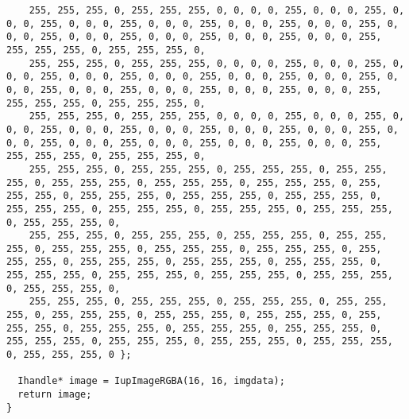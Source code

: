 \documentclass{ctexart}
\begin{document}
\begin{lstlisting}
    255, 255, 255, 0, 255, 255, 255, 0, 0, 0, 0, 255, 0, 0, 0, 255, 0, 0, 0, 255, 0, 0, 0, 255, 0, 0, 0, 255, 0, 0, 0, 255, 0, 0, 0, 255, 0, 0, 0, 255, 0, 0, 0, 255, 0, 0, 0, 255, 0, 0, 0, 255, 0, 0, 0, 255, 255, 255, 255, 0, 255, 255, 255, 0,
    255, 255, 255, 0, 255, 255, 255, 0, 0, 0, 0, 255, 0, 0, 0, 255, 0, 0, 0, 255, 0, 0, 0, 255, 0, 0, 0, 255, 0, 0, 0, 255, 0, 0, 0, 255, 0, 0, 0, 255, 0, 0, 0, 255, 0, 0, 0, 255, 0, 0, 0, 255, 0, 0, 0, 255, 255, 255, 255, 0, 255, 255, 255, 0,
    255, 255, 255, 0, 255, 255, 255, 0, 0, 0, 0, 255, 0, 0, 0, 255, 0, 0, 0, 255, 0, 0, 0, 255, 0, 0, 0, 255, 0, 0, 0, 255, 0, 0, 0, 255, 0, 0, 0, 255, 0, 0, 0, 255, 0, 0, 0, 255, 0, 0, 0, 255, 0, 0, 0, 255, 255, 255, 255, 0, 255, 255, 255, 0,
    255, 255, 255, 0, 255, 255, 255, 0, 255, 255, 255, 0, 255, 255, 255, 0, 255, 255, 255, 0, 255, 255, 255, 0, 255, 255, 255, 0, 255, 255, 255, 0, 255, 255, 255, 0, 255, 255, 255, 0, 255, 255, 255, 0, 255, 255, 255, 0, 255, 255, 255, 0, 255, 255, 255, 0, 255, 255, 255, 0, 255, 255, 255, 0,
    255, 255, 255, 0, 255, 255, 255, 0, 255, 255, 255, 0, 255, 255, 255, 0, 255, 255, 255, 0, 255, 255, 255, 0, 255, 255, 255, 0, 255, 255, 255, 0, 255, 255, 255, 0, 255, 255, 255, 0, 255, 255, 255, 0, 255, 255, 255, 0, 255, 255, 255, 0, 255, 255, 255, 0, 255, 255, 255, 0, 255, 255, 255, 0,
    255, 255, 255, 0, 255, 255, 255, 0, 255, 255, 255, 0, 255, 255, 255, 0, 255, 255, 255, 0, 255, 255, 255, 0, 255, 255, 255, 0, 255, 255, 255, 0, 255, 255, 255, 0, 255, 255, 255, 0, 255, 255, 255, 0, 255, 255, 255, 0, 255, 255, 255, 0, 255, 255, 255, 0, 255, 255, 255, 0, 255, 255, 255, 0 };

  Ihandle* image = IupImageRGBA(16, 16, imgdata);
  return image;
}


\end{lstlisting}
\end{document}
